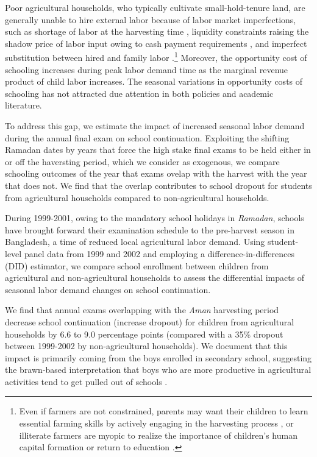 \documentclass[12pt,letterpaper]{article}
\newcommand{\0}{\ensuremath{\mbox{\boldmath $0$}}}
\begin{document}
Poor agricultural households, who typically cultivate small-hold-tenure land, are generally unable to hire external labor because of labor market imperfections, such as shortage of labor at the harvesting time \citep{rosenzweig1988labor}, liquidity constraints raising the shadow price of labor input owing to cash payment requirements \citep{singh1986agricultural}, and imperfect substitution between hired and family labor \citep{de1991peasant}.\footnote{Even if farmers are not constrained, parents may want their children to learn essential farming skills by actively engaging in the harvesting process \citep{bhalotra2003child}, or illiterate farmers are myopic to realize the importance of children's human capital formation or return to education \citep{BalandRobinson2000}. } Moreover, the opportunity cost of schooling increases during peak labor demand time as the marginal revenue product of child labor increases. The seasonal variations in opportunity costs of schooling has not attracted due attention in both policies and academic literature. 

To address this gap, we estimate the impact of increased seasonal labor demand during the annual final exam on school continuation. Exploiting the shifting Ramadan dates by years that force the high stake final exams to be held either in or off the haversting period, which we consider as exogenous, we compare schooling outcomes of the year that exams ovelap with the harvest with the year that does not. We find that the overlap contributes to school dropout for students from agricultural households compared to non-agricultural households. 

During 1999-2001, owing to the mandatory school holidays in \textit{Ramadan}, schools have brought forward their examination schedule to the pre-harvest season in Bangladesh, a time of reduced local agricultural labor demand. Using student-level panel data from 1999 and 2002 and employing a difference-in-differences (DID) estimator, we compare school enrollment between children from agricultural and non-agricultural households to assess the differential impacts of seasonal labor demand changes on school continuation. 

We find that annual exams overlapping with the \textit{Aman} harvesting period decrease school continuation (increase dropout) for children from agricultural households by 6.6 to 9.0 percentage points (compared with a 35\% dropout between 1999-2002 by non-agricultural households). We document that this impact is primarily coming from the boys enrolled in secondary school, suggesting the brawn-based interpretation that boys who are more productive in agricultural activities tend to get pulled out of schools \citep{PittRosenzweigHassan2010}. 
\end{document}
